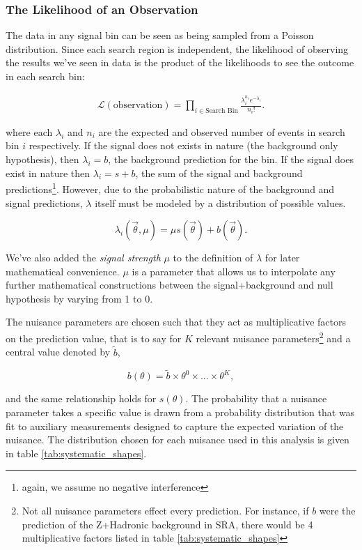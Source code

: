     \subsubsection{The Likelihood of an Observation}

      The data in any signal bin can be seen as being sampled from a Poisson distribution. Since each search region is independent, the likelihood of observing the results we've seen in data is the product of the likelihoods to see the outcome in each search bin:

      \begin{align} 
        \mathcal{L}(\text{observation}) = \prod_{i \in \text{Search Bin}} \frac{\lambda_i^{n_i} e^{-\lambda_i}}{n_i !}. \label{eq:niave_likelihood}
      \end{align}

      where each $\lambda_i$ and $n_i$ are the expected and observed number of events in search bin $i$ respectively. If the signal does not exists in nature (the background only hypothesis), then $\lambda_i = b$, the background prediction for the bin. If the signal does exist in nature then $\lambda_i = s + b$, the sum of the signal and background predictions\footnote{again, we assume no negative interference}. However, due to the probabilistic nature of the background and signal predictions, $\lambda$ itself must be modeled by a distribution of possible values. 

      \[
        \lambda_i(\vec{\theta}, \mu) = \mu s(\vec{\theta}) + b(\vec{\theta}).
      \]

      We've also added the \emph{signal strength} $\mu$ to the definition of $\lambda$ for later mathematical convenience. $\mu$ is a parameter that allows us to interpolate any further mathematical constructions between the signal+background and null hypothesis by varying from 1 to 0.

      The nuisance parameters are chosen such that they act as multiplicative factors on the prediction value, that is to say for $K$ relevant nuisance parameters\footnote{Not all nuisance parameters effect every prediction. For instance, if $b$ were the prediction of the Z+Hadronic background in SRA, there would be 4 multiplicative factors listed in table \ref{tab:systematic_shapes}} and a central value denoted by $\widetilde{b}$,

      \[
        b(\theta) = \widetilde{b} \times \theta^0 \times ... \times \theta^K,
      \]

      and the same relationship holds for $s(\theta)$. The probability that a nuisance parameter takes a specific value is drawn from a probability distribution that was fit to auxiliary measurements designed to capture the expected variation of the nuisance. The distribution chosen for each nuisance used in this analysis is given in table \ref{tab:systematic_shapes}. 

